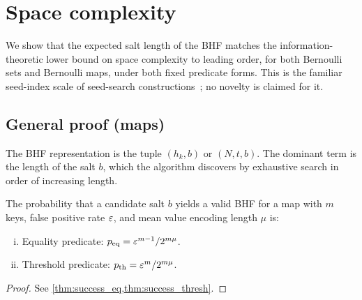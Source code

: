 \section{Space complexity}
\label{sec:space}

We show that the expected salt length of the BHF matches the
information-theoretic lower bound on space complexity to leading order, for
both Bernoulli sets and Bernoulli maps, under both fixed predicate forms.
This is the familiar seed-index scale of seed-search
constructions~\cite{esposito2020recsplit,lehmann2024shockhash,lehmann2025seeds};
no novelty is claimed for it.

\subsection{General proof (maps)}

The BHF representation is the tuple $(h_k, b)$ or $(N, t, b)$.
The dominant term is the length of the salt $b$, which the algorithm discovers
by exhaustive search in order of increasing length.

\begin{theorem}
\label{thm:success_prob}
The probability that a candidate salt $b$ yields a valid BHF for a map with
$m$ keys, false positive rate $\varepsilon$, and mean value encoding length $\mu$
is:
\begin{enumerate}[(i)]
    \item Equality predicate: $p_{\mathrm{eq}} = \varepsilon^{m-1} / 2^{m\mu}$.
    \item Threshold predicate: $p_{\mathrm{th}} = \varepsilon^{m} / 2^{m\mu}$.
\end{enumerate}
\end{theorem}
\begin{proof}
See \cref{thm:success_eq,thm:success_thresh}.
\end{proof}

